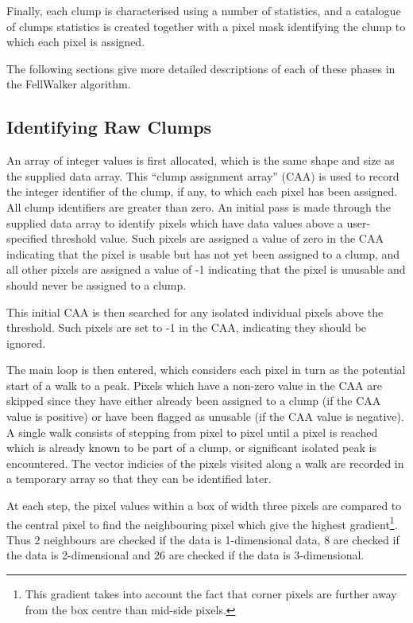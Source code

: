 \documentclass[final,authoryear,5p,times,twocolumn]{elsarticle}
\begin{document}
Finally, each clump is characterised using a number of statistics, and a
catalogue of clumps statistics is created together with a pixel mask
identifying the clump to which each pixel is assigned.

The following sections give more detailed descriptions of each of these
phases in the FellWalker algorithm.

\subsection{Identifying Raw Clumps}
An array of integer values is first allocated, which is the same shape
and size as the supplied data array. This ``clump assignment array''
(CAA) is used to record the integer identifier of the clump, if any, to
which each pixel has been assigned. All clump identifiers are greater
than zero. An initial pass is made through the supplied data array to
identify pixels which have data values above a user-specified threshold
value. Such pixels are assigned a value of zero in the CAA indicating
that the pixel is usable but has not yet been assigned to a clump, and
all other pixels are assigned a value of -1 indicating that the pixel is
unusable and should never be assigned to a clump.

This initial CAA is then searched for any isolated individual pixels
above the threshold. Such pixels are set to -1 in the CAA, indicating
they should be ignored.

The main loop is then entered, which considers each pixel in turn as the
potential start of a walk to a peak. Pixels which have a non-zero value
in the CAA are skipped since they have either already been assigned to a
clump (if the CAA value is positive) or have been flagged as unusable (if
the CAA value is negative). A single walk consists of stepping from pixel
to pixel until a pixel is reached which is already known to be part of a
clump, or significant isolated peak is encountered. The vector indicies of
the pixels visited along a walk are recorded in a temporary array so that
they  can be identified later.

At each step, the pixel values within a box of width three pixels are compared
to the central pixel to find the neighbouring pixel which give the highest
gradient\footnote{This gradient takes into account the fact that corner
pixels are further away from the box centre than mid-side pixels.}. Thus
2 neighbours are checked if the data is 1-dimensional data, 8 are
checked if the data is 2-dimensional and 26 are checked if the data is
3-dimensional.
\end{document}
